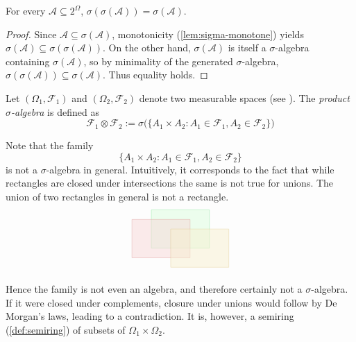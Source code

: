 \begin{corollary}[Idempotency]\label{cor:sigma-idempotent}
For every $\mathcal{A} \subseteq 2^\Omega$,
\(
\sigma(\sigma(\mathcal{A})) = \sigma(\mathcal{A})
\).
\end{corollary}

\begin{proof}
Since $\mathcal{A} \subseteq \sigma(\mathcal{A})$, monotonicity (\autoref{lem:sigma-monotone}) yields
\(
\sigma(\mathcal{A}) \subseteq \sigma(\sigma(\mathcal{A}))
\).
On the other hand, $\sigma(\mathcal{A})$ is itself a $\sigma$-algebra containing $\sigma(\mathcal{A})$, so by minimality of the generated $\sigma$-algebra,
\(
\sigma(\sigma(\mathcal{A})) \subseteq \sigma(\mathcal{A})
\).
Thus equality holds.
\end{proof}

\begin{example}\label{ex:product-sigma-algebra}
Let $(\Omega_1,\mathcal{F}_1)$ and $(\Omega_2,\mathcal{F}_2)$ denote two measurable spaces (see ). 
The \emph{product $\sigma$-algebra} is defined as
\[
  \mathcal{F}_1 \otimes \mathcal{F}_2 := \sigma\bigl(\{A_1 \times A_2 : A_1 \in \mathcal{F}_1, A_2 \in \mathcal{F}_2\}\bigr)
\]


Note that the family
\[
\{A_1 \times A_2 : A_1 \in \mathcal{F}_1, A_2 \in \mathcal{F}_2\}
\]
is not a $\sigma$-algebra in general.
Intuitively, it corresponds to the fact that while rectangles are closed under intersections the same is not true for unions.
The union of two rectangles in general is not a rectangle.
\[
\begin{tikzpicture}[scale=0.7]
\definecolor{aFill}{HTML}{dbfedd}
\definecolor{aStroke}{HTML}{5bd772}
\definecolor{bFill}{HTML}{f8d7d7}
\definecolor{bStroke}{HTML}{d07a7a}
\definecolor{cFill}{HTML}{f8efcf}
\definecolor{cStroke}{HTML}{d5b86a}
\filldraw[aFill, draw=aStroke, opacity=0.5] (2,2.5) rectangle (5,4.5);
\filldraw[bFill, draw=bStroke, opacity=0.5] (1,2) rectangle (4,4);
\filldraw[cFill, draw=cStroke, opacity=0.5] (3,1.5) rectangle (6,3.5);
\end{tikzpicture}
\]

Hence the family is not even an algebra, and therefore certainly not a $\sigma$-algebra.
If it were closed under complements, closure under unions would follow by De Morgan's laws, leading to a contradiction.
It is, however, a semiring (\autoref{def:semiring}) of subsets of $\Omega_1 \times \Omega_2$.
\end{example}

